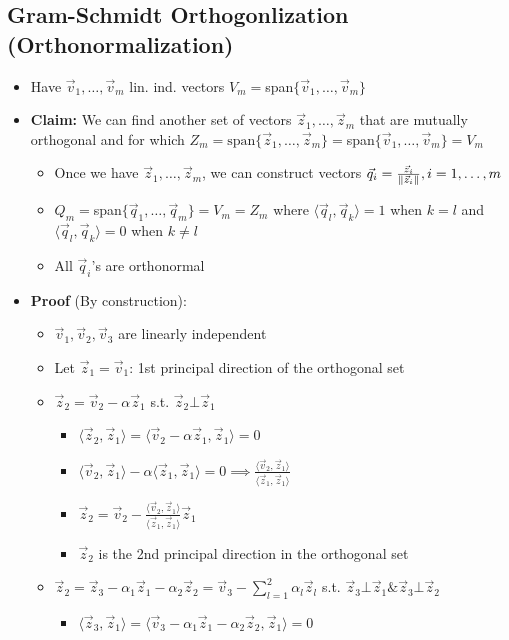 \documentclass{article}\usepackage{amsmath,amssymb,amsthm,tikz,tkz-graph,color,chngpage,soul,hyperref,csquotes,graphicx,floatrow,framed,scrextend,mathtools,mathrsfs}\newcommand*{\QEDB}{\hfill\ensuremath{\square}}\newtheorem*{prop}{Proposition}\renewcommand{\theenumi}{\alph{enumi}}\usepackage[shortlabels]{enumitem}\usepackage[nobreak=true]{mdframed}\usetikzlibrary{matrix,calc}\MakeOuterQuote{"}\usepackage[margin=0.75in]{geometry} \newtheorem{theorem}{Theorem}\newcommand{\Z}{\mathbb Z}\newcommand{\R}{\mathbb R}\newcommand{\Q}{\mathbb Q}\newcommand{\N}{\mathbb N}\newcommand{\x}[1]{\textrm{#1}}\newcommand{\xs}[1]{\textrm{ #1 }}\newcommand{\pr}{\textrm{Pr}}
\newcommand{\sumlim}[3]{\sum\limits_{#1}^{#2}#3}
\newcommand{\set}[1]{\{#1\}}
\newcommand{\inprod}[2]{\langle #1, #2\rangle}
\DeclarePairedDelimiter{\norm}{\lVert}{\rVert}
\newcommand{\items}[1]{\begin{itemize}#1\end{itemize}}
\begin{document}
\subsection*{Gram-Schmidt Orthogonlization (Orthonormalization)}
\items{
    \item Have $\vec{v}_1,\ldots,\vec{v}_m$ lin. ind. vectors $V_m=$span$\set{\vec{v}_1,\ldots,\vec{v}_m}$
    \item \textbf{Claim:} We can find another set of vectors $\vec{z}_1,\ldots,\vec{z}_m$ that are mutually orthogonal and for which $Z_m=\x{span}\set{\vec{z}_1,\ldots,\vec{z}_m}=$span$\set{\vec{v}_1,\ldots,\vec{v}_m}=V_m$
    \items{
        \item Once we have $\vec{z}_1,\ldots,\vec{z}_m$, we can construct vectors $\vec{q}_i=\frac{\vec{z}_i}{\norm{\vec{z}_i}}, i=1,\ldots,m$
        \item $Q_m=$span$\set{\vec{q}_1,\ldots,\vec{q}_m}=V_m=Z_m$ where $\inprod{\vec{q}_l}{\vec{q}_k}=1$ when $k=l$ and $\inprod{\vec{q}_l}{\vec{q}_k}=0$ when $k\ne l$
        \item All $\vec{q}_i$'s are orthonormal
    }
    \item \textbf{Proof} (By construction):
    \items{
        \item $\vec{v}_1, \vec{v}_2, \vec{v}_3$ are linearly independent
        \item Let $\vec{z}_1=\vec{v}_1$: 1st principal direction of the orthogonal set
        \item $\vec{z}_2=\vec{v}_2-\alpha\vec{z}_1$ s.t. $\vec{z}_2\bot\vec{z}_1$
        \items{
            \item $\inprod{\vec{z}_2}{\vec{z}_1}=\inprod{\vec{v}_2-\alpha\vec{z}_1}{\vec{z}_1}=0$
            \item $\inprod{\vec{v}_2}{\vec{z}_1}-\alpha\inprod{\vec{z}_1}{\vec{z}_1}=0\implies\frac{\inprod{\vec{v}_2}{\vec{z}_1}}{\inprod{\vec{z}_1}{\vec{z}_1}}$
            \item $\vec{z}_2=\vec{v}_2-\frac{\inprod{\vec{v}_2}{\vec{z}_1}}{\inprod{\vec{z}_1}{\vec{z}_1}}\vec{z}_1$
            \item $\vec{z}_2$ is the 2nd principal direction in the orthogonal set 
        }
        \item $\vec{z}_2=\vec{z}_3-\alpha_1\vec{z}_1-\alpha_2\vec{z}_2=\vec{v}_3-\sumlim{l=1}{2}{\alpha_l\vec{z}_l}$ s.t. $\vec{z}_3\bot\vec{z}_1\x{\&}\vec{z}_3\bot\vec{z}_2$
        \items{
            \item $\inprod{\vec{z}_3}{\vec{z}_1}=\inprod{\vec{v}_3-\alpha_1\vec{z}_1-\alpha_2\vec{z}_2}{\vec{z}_1}=0$
}}}
\end{document}
